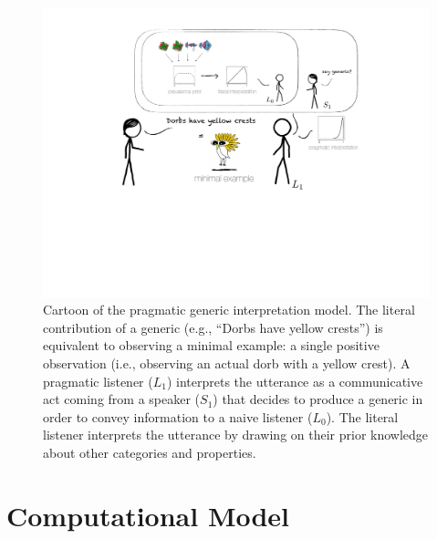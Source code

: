 \documentclass[floatsintext,doc]{apa6}
\newcommand{\ndg}[1]{{\textcolor{Green}{[ndg: #1]}}}
\begin{document}
\begin{figure}
\centering
\includegraphics{figs/cartoon3.pdf}
\caption{\label{fig:cartoon}Cartoon of the pragmatic generic interpretation model. The literal contribution of a generic (e.g., \enquote{Dorbs have yellow crests}) is equivalent to observing a minimal example: a single positive observation (i.e., observing an actual dorb with a yellow crest). 
A pragmatic listener (\(L_1\)) interprets the utterance as a communicative act coming from a speaker (\(S_1\)) that decides to produce a generic in order to convey information to a naive listener (\(L_0\)). 
The literal listener interprets the utterance by drawing on their prior knowledge about other categories and properties.
}
\end{figure}

\hypertarget{computational-model}{%
\section{Computational Model}\label{computational-model}}
\end{document}
